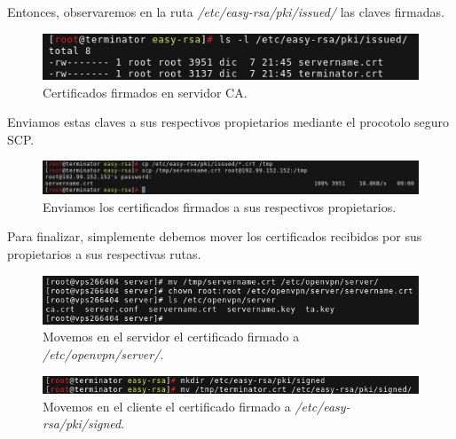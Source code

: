 \documentclass[a4paper, 11pt, titlepage]{article}
\begin{document}
            Entonces, observaremos en la ruta \textit{/etc/easy-rsa/pki/issued/} las claves firmadas.
        
            \begin{figure}[htp]
                \centering
                \includegraphics[width=1\textwidth]{resources/ca19.png}
                \caption{Certificados firmados en servidor CA.}
                \label{ca19}
            \end{figure}
        
            Enviamos estas claves a sus respectivos propietarios mediante el procotolo seguro SCP.
        
            \begin{figure}[htp]
                \centering
                \includegraphics[width=1\textwidth]{resources/ca20.png}
                \caption{Enviamos los certificados firmados a sus respectivos propietarios.}
                \label{ca20}
            \end{figure}
        
            Para finalizar, simplemente debemos mover los certificados recibidos por sus propietarios
            a sus respectivas rutas.
        
            \begin{figure}[htp]
                \centering
                \includegraphics[width=1\textwidth]{resources/ca21.png}
                \caption{Movemos en el servidor el certificado firmado a \textit{/etc/openvpn/server/}.}
                \label{ca21}
            \end{figure}
        
            \begin{figure}[htp]
                \centering
                \includegraphics[width=1\textwidth]{resources/ca22.png}
                \caption{Movemos en el cliente el certificado firmado a \textit{/etc/easy-rsa/pki/signed}.}
                \label{ca22}
            \end{figure}
\end{document}
